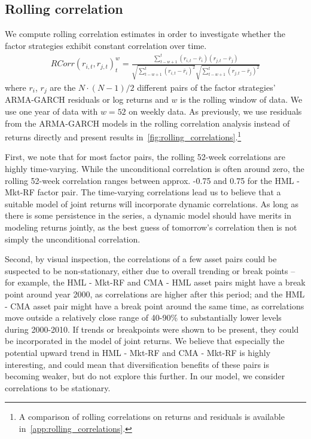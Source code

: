 \subsection{Rolling correlation}
We compute rolling correlation estimates in order to investigate whether the factor strategies exhibit constant correlation over time. 
\begin{align}
    RCorr(r_{i, t}, r_{j, t})_t^{w} = \frac{\sum^{t}_{t-w+1}(r_{i, t} - \bar{r}_i)(r_{j,t} - \bar{r}_j)}{\sqrt{\sum^{t}_{t-w+1} (r_{i,t} - \bar{r}_i)^2} \sqrt{\sum^{t}_{t-w+1} (r_{j,t} - \bar{r}_j)^2}}
\end{align}
where $r_i$, $r_j$ are the $N \cdot (N-1) / 2$ different pairs of the factor strategies' ARMA-GARCH residuals or log returns and $w$ is the rolling window of data. We use one year of data with $w = 52$ on weekly data. As previously, we use residuals from the ARMA-GARCH models in the rolling correlation analysis instead of returns directly and present results in~\autoref{fig:rolling_correlations}.\footnote{A comparison of rolling correlations on returns and residuals is available in~\autoref{app:rolling_correlations}.}

First, we note that for most factor pairs, the rolling 52-week correlations are highly time-varying. While the unconditional correlation is often around zero, the rolling 52-week correlation ranges between approx. -0.75 and 0.75 for the HML - Mkt-RF factor pair. The time-varying correlations lead us to believe that a suitable model of joint returns will incorporate dynamic correlations. As long as there is some persistence in the series, a dynamic model should have merits in modeling returns jointly, as the best guess of tomorrow's correlation then is not simply the unconditional correlation.

Second, by visual inspection, the correlations of a few asset pairs could be suspected to be non-stationary, either due to overall trending or break points -- for example, the HML - Mkt-RF and CMA - HML asset pairs might have a break point around year 2000, as correlations are higher after this period; and the HML - CMA asset pair might have a break point around the same time, as correlations move outside a relatively close range of 40-90\% to substantially lower levels during 2000-2010. If trends or breakpoints were shown to be present, they could be incorporated in the model of joint returns. We believe that especially the potential upward trend in HML - Mkt-RF and CMA - Mkt-RF is highly interesting, and could mean that diversification benefits of these pairs is becoming weaker, but do not explore this further. In our model, we consider correlations to be stationary.

